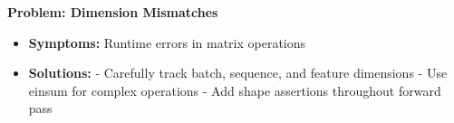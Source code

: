 \textbf{Problem: Dimension Mismatches}
\begin{itemize}
    \item \textbf{Symptoms:} Runtime errors in matrix operations
    \item \textbf{Solutions:}
        - Carefully track batch, sequence, and feature dimensions
        - Use einsum for complex operations
        - Add shape assertions throughout forward pass
\end{itemize}
